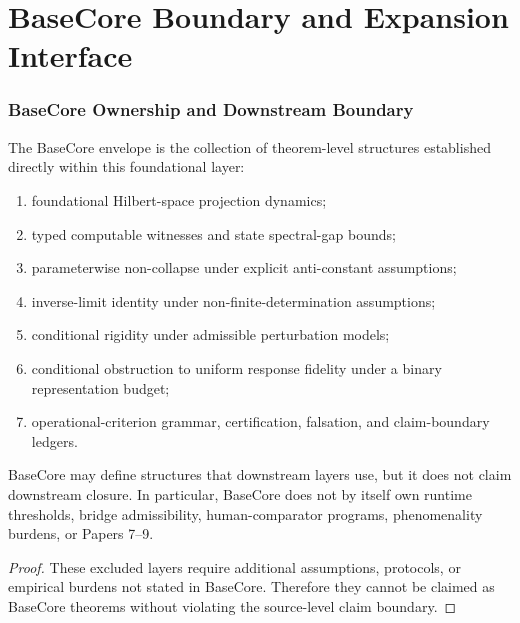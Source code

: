 \part{BaseCore Boundary and Expansion Interface}
\section{BaseCore Ownership and Downstream Boundary}

\begin{definition}
The BaseCore envelope is the collection of theorem-level structures established directly within this foundational layer:
\begin{enumerate}[leftmargin=*]
\item foundational Hilbert-space projection dynamics;
\item typed computable witnesses and state spectral-gap bounds;
\item parameterwise non-collapse under explicit anti-constant assumptions;
\item inverse-limit identity under non-finite-determination assumptions;
\item conditional rigidity under admissible perturbation models;
\item conditional obstruction to uniform response fidelity under a binary representation budget;
\item operational-criterion grammar, certification, falsation, and claim-boundary ledgers.
\end{enumerate}
\end{definition}

\begin{proposition}
BaseCore may define structures that downstream layers use, but it does not claim downstream closure. In particular, BaseCore does not by itself own runtime thresholds, bridge admissibility, human-comparator programs, phenomenality burdens, or Papers 7--9.
\end{proposition}

\begin{proof}
These excluded layers require additional assumptions, protocols, or empirical burdens not stated in BaseCore. Therefore they cannot be claimed as BaseCore theorems without violating the source-level claim boundary.
\end{proof}

